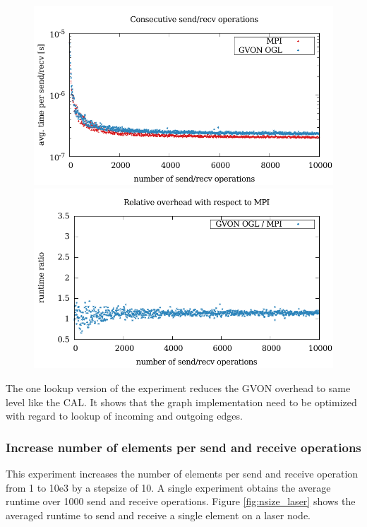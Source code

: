 \begin{figure}[H]
  \caption{ }
  \label{fig:nsend_kepler}
  \begin{minipage}[t]{0.5\textwidth} 
    \includegraphics[width=\textwidth]{plots/50_nsend_one_lookup_kepler}
  \end{minipage}
  \begin{minipage}[t]{0.5\textwidth}
    \includegraphics[width=\textwidth]{plots/50_nsend_one_lookup_overhead_gvon_kepler}
  \end{minipage}
\end{figure}

The one lookup version of the experiment reduces the GVON overhead
to same level like the CAL. It shows that the graph implementation
need to be optimized with regard to lookup of incoming and
outgoing edges.

\subsubsection*{Increase number of elements per send and receive operations}
This experiment increases the number of elements per send and receive
operation from 1 to 10e3 by a stepsize of 10. A single experiment
obtains the average runtime over 1000 send and receive operations.
Figure \ref{fig:nsize_laser} shows the averaged runtime to send and
receive a single element on a laser node.

